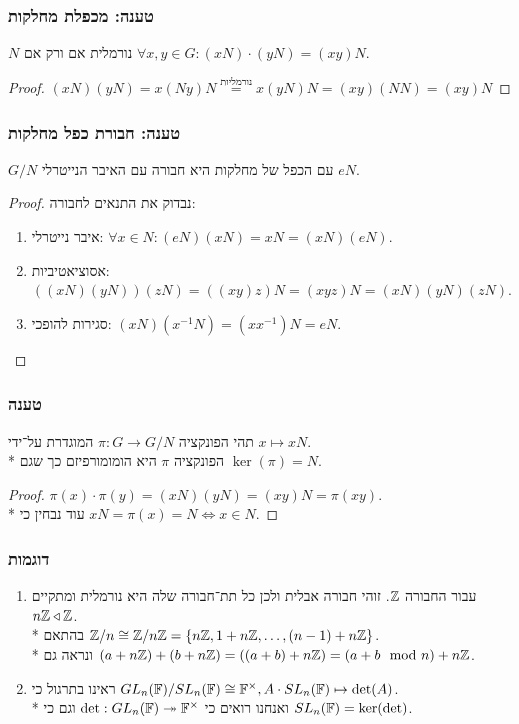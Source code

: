 \subsubsection{טענה: מכפלת מחלקות}
$N$ נורמלית אם ורק אם $\forall x, y \in G : (xN) \cdot (yN) = (xy)N$.
\begin{proof}
	$(x N)(y N) = x (Ny) N \overset{\text{נורמליות}}{=} x (yN) N = (xy)(NN) = (xy)N$
\end{proof}

\subsubsection{טענה: חבורת כפל מחלקות}
$G/N$ עם הכפל של מחלקות היא חבורה עם האיבר הנייטרלי $eN$.
\begin{proof}
	נבדוק את התנאים לחבורה:
	\begin{enumerate}
		\item איבר נייטרלי: $\forall x \in N: (eN)(xN) = xN = (xN)(eN)$.
		\item אסוציאטיביות: $((xN)(yN))(zN) = ((xy)z)N = (xyz)N = (xN)(yN)(zN)$.
		\item סגירות להופכי: $(xN)(x^{-1}N) = (xx^{-1})N = eN$.
	\end{enumerate}
\end{proof}

\subsubsection{טענה}
תהי הפונקציה $\pi : G \to G/N$ המוגדרת על־ידי $x \mapsto x N$. \\*
הפונקציה $\pi$ היא הומומורפיזם כך שגם $\ker(\pi) = N$.
\begin{proof}
	$\pi(x) \cdot \pi(y) = (xN)(yN) = (xy)N = \pi(xy)$. \\*
	עוד נבחין כי $x N = \pi(x) = N \iff x \in N$.
\end{proof}
 
\subsubsection{דוגמות}
\begin{enumerate}
	\item עבור החבורה $\mathbb{Z}$. זוהי חבורה אבלית ולכן כל תת־חבורה שלה היא נורמלית ומתקיים $n \mathbb{Z} \triangleleft \mathbb{Z}$. \\*
		בהתאם $\mathbb{Z}/n \cong \mathbb{Z} / n \mathbb{Z} = \{ n \mathbb{Z}, 1 + n \mathbb{Z}, \dots, (n - 1) + n \mathbb{Z} \}$. \\*
		ונראה גם $(a + n \mathbb{Z}) + (b + n \mathbb{Z}) = ((a + b) + n \mathbb{Z}) = (a + b \mod n) + n \mathbb{Z}$.
	\item ראינו בתרגול כי $GL_n(\mathbb{F}) / SL_n(\mathbb{F}) \cong \mathbb{F}^\times, A \cdot SL_n(\mathbb{F}) \mapsto \det(A)$. \\*
		ואנחנו רואים כי $\det : GL_n(\mathbb{F}) \twoheadrightarrow \mathbb{F}^\times$ וגם כי $SL_n(\mathbb{F}) = \ker(\det)$.
\end{enumerate}


